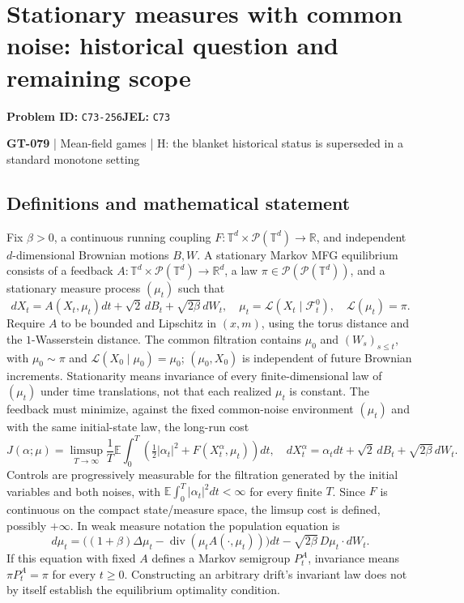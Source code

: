 \documentclass[11pt,a4paper]{article}
\begin{document}
\section*{Stationary measures with common noise: historical question and remaining scope}
\textbf{Problem ID:} \texttt{C73-256}\quad \textbf{JEL:} \texttt{C73}\par
\label{problem:OP-0209}
\label{game:GT-079}
{\sffamily\small\color{muted}
{\small\textbf{GT-079} | Mean-field games | H: the blanket historical status is superseded in a standard monotone setting\par}
\par}
\subsection*{Definitions and mathematical statement}
Fix $\beta>0$, a continuous running coupling $F:\mathbb T^d\times\mathcal P(\mathbb T^d)\to\mathbb R$, and independent $d$-dimensional Brownian motions $B,W$. A stationary Markov MFG equilibrium consists of a feedback $A:\mathbb T^d\times\mathcal P(\mathbb T^d)\to\mathbb R^d$, a law $\pi\in\mathcal P(\mathcal P(\mathbb T^d))$, and a stationary measure process $(\mu_t)$ such that
\[
 dX_t=A(X_t,\mu_t)dt+\sqrt2\,dB_t+\sqrt{2\beta}\,dW_t,
 \quad \mu_t=\mathcal L(X_t\mid\mathcal F_t^0),\quad
 \mathcal L(\mu_t)=\pi.
\]
Require $A$ to be bounded and Lipschitz in $(x,m)$, using the torus distance and the $1$-Wasserstein distance. The common filtration contains $\mu_0$ and $(W_s)_{s\leq t}$, with $\mu_0\sim\pi$ and $\mathcal L(X_0\mid\mu_0)=\mu_0$; $(\mu_0,X_0)$ is independent of future Brownian increments. Stationarity means invariance of every finite-dimensional law of $(\mu_t)$ under time translations, not that each realized $\mu_t$ is constant. The feedback must minimize, against the fixed common-noise environment $(\mu_t)$ and with the same initial-state law, the long-run cost
\[
 J(\alpha;\mu)=\limsup_{T\to\infty}\frac1T
 \mathbb E\!\int_0^T\left(\tfrac12|\alpha_t|^2+F(X_t^\alpha,\mu_t)\right)dt,
 \quad
 dX_t^\alpha=\alpha_tdt+\sqrt2\,dB_t+\sqrt{2\beta}\,dW_t.
\]
Controls are progressively measurable for the filtration generated by the initial variables and both noises, with $\mathbb E\int_0^T|\alpha_t|^2dt<\infty$ for every finite $T$. Since $F$ is continuous on the compact state/measure space, the limsup cost is defined, possibly $+\infty$. In weak measure notation the population equation is
\[
 d\mu_t=\big((1+\beta)\Delta\mu_t-\operatorname{div}(\mu_t A(\cdot,\mu_t))\big)dt
             -\sqrt{2\beta}\,D\mu_t\cdot dW_t.
\]
If this equation with fixed $A$ defines a Markov semigroup $P_t^A$, invariance means $\pi P_t^A=\pi$ for every $t\geq0$. Constructing an arbitrary drift's invariant law does not by itself establish the equilibrium optimality condition.
\end{document}
